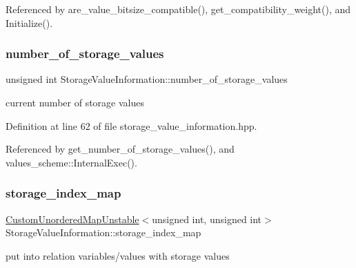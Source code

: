Referenced by are\+\_\+value\+\_\+bitsize\+\_\+compatible(), get\+\_\+compatibility\+\_\+weight(), and Initialize().

\mbox{\label{classStorageValueInformation_a3bfe09e2d9557c3554108765579b9372}} 
\subsubsection{\texorpdfstring{number\+\_\+of\+\_\+storage\+\_\+values}{number\_of\_storage\_values}}
{\footnotesize\ttfamily unsigned int Storage\+Value\+Information\+::number\+\_\+of\+\_\+storage\+\_\+values\hspace{0.3cm}{\ttfamily [protected]}}



current number of storage values 



Definition at line 62 of file storage\+\_\+value\+\_\+information.\+hpp.



Referenced by get\+\_\+number\+\_\+of\+\_\+storage\+\_\+values(), and values\+\_\+scheme\+::\+Internal\+Exec().

\mbox{\label{classStorageValueInformation_a68d366c305f831df0a0c98ae27dd83c5}} 
\subsubsection{\texorpdfstring{storage\+\_\+index\+\_\+map}{storage\_index\_map}}
{\footnotesize\ttfamily \hyperlink{custom__map_8hpp_a8cbaceffc09790a885ec7e9c17809c69}{Custom\+Unordered\+Map\+Unstable}$<$unsigned int, unsigned int$>$ Storage\+Value\+Information\+::storage\+\_\+index\+\_\+map\hspace{0.3cm}{\ttfamily [protected]}}



put into relation variables/values with storage values 



